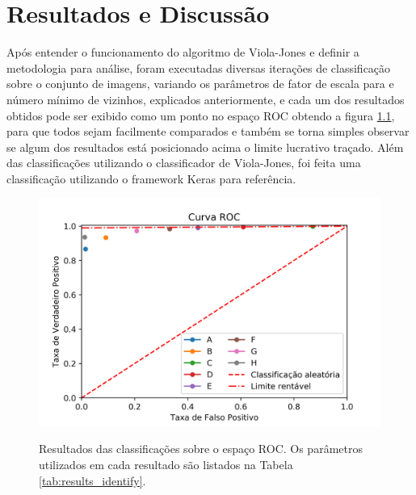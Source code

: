 \chapter{Resultados e Discussão}\label{cap:resultados}

Após entender o funcionamento do algoritmo de Viola-Jones e definir a metodologia para análise, foram executadas diversas iterações de classificação sobre o conjunto de imagens, variando os parâmetros de fator de escala para e número mínimo de vizinhos, explicados anteriormente, e cada um dos resultados obtidos pode ser exibido como um ponto no espaço ROC obtendo a figura \ref{fig:results_roc}, para que todos sejam facilmente comparados e também se torna simples observar se algum dos resultados está posicionado acima o limite lucrativo traçado. Além das classificações utilizando o classificador de Viola-Jones, foi feita uma classificação utilizando o framework Keras \cite{keras_brownlee_2019} para referência. 

\begin{figure}[htbp]
     \centering
     \caption{Resultados das classificações sobre o espaço ROC. Os parâmetros utilizados em cada resultado são listados na Tabela \ref{tab:results_identify}.}
     \includegraphics[scale=1]{figs/curva_roc_results.png}
     \label{fig:results_roc}
 \end{figure}

